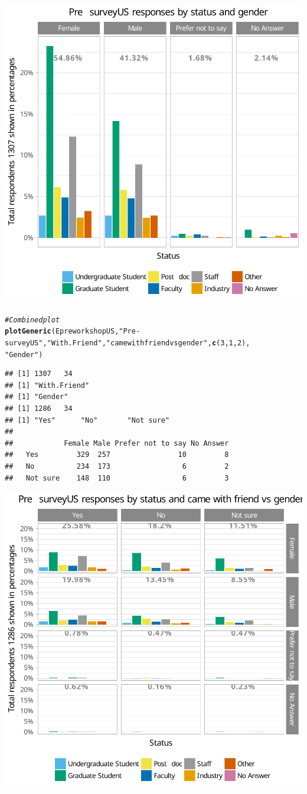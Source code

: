 \documentclass{article}\usepackage[]{graphicx}\usepackage[]{color}
\makeatletter
\newcommand{\hlnum}[1]{\textcolor[rgb]{0.686,0.059,0.569}{#1}}%
\newcommand{\hlstr}[1]{\textcolor[rgb]{0.192,0.494,0.8}{#1}}%
\newcommand{\hlcom}[1]{\textcolor[rgb]{0.678,0.584,0.686}{\textit{#1}}}%
\newcommand{\hlstd}[1]{\textcolor[rgb]{0.345,0.345,0.345}{#1}}%
\newcommand{\hlkwd}[1]{\textcolor[rgb]{0.737,0.353,0.396}{\textbf{#1}}}%
\newenvironment{kframe}{%
 \def\at@end@of@kframe{}%
 \ifinner\ifhmode%
  \def\at@end@of@kframe{\end{minipage}}%
  \begin{minipage}{\columnwidth}%
 \fi\fi%
 \def\FrameCommand##1{\hskip\@totalleftmargin \hskip-\fboxsep
 \colorbox{shadecolor}{##1}\hskip-\fboxsep
     \hskip-\linewidth \hskip-\@totalleftmargin \hskip\columnwidth}%
 \MakeFramed {\advance\hsize-\width
   \@totalleftmargin\z@ \linewidth\hsize
   \@setminipage}}%
 {\par\unskip\endMakeFramed%
 \at@end@of@kframe}
\newenvironment{knitrout}{}{} %
\makeatother
\begin{document}
\begin{knitrout}
{\centering \includegraphics[width=.6\linewidth]{figure/calls-Rnwplotting-presurvey-dataUS-2} 

}


\begin{kframe}\begin{alltt}
\hlcom{# Combined plot}
\hlkwd{plotGeneric}\hlstd{(EpreworkshopUS,} \hlstr{"Pre-surveyUS"}\hlstd{,}\hlstr{"With.Friend"} \hlstd{,} \hlstr{"came with friend vs gender"}\hlstd{,} \hlkwd{c}\hlstd{(}\hlnum{3}\hlstd{,}\hlnum{1}\hlstd{,}\hlnum{2}\hlstd{),}
            \hlstr{"Gender"} \hlstd{)}
\end{alltt}
\begin{verbatim}
## [1] 1307   34
## [1] "With.Friend"
## [1] "Gender"
## [1] 1286   34
## [1] "Yes"      "No"       "Not sure"
##           
##            Female Male Prefer not to say No Answer
##   Yes         329  257                10         8
##   No          234  173                 6         2
##   Not sure    148  110                 6         3
\end{verbatim}
\end{kframe}

{\centering \includegraphics[width=.6\linewidth]{figure/calls-Rnwplotting-presurvey-dataUS-3} 

}
\end{knitrout}
\end{document}
